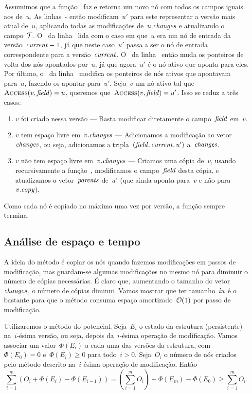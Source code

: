 \documentclass[../../main.tex]{subfiles}
\begin{document}
Assumimos que a função~ faz e retorna um novo nó com todos os campos iguais aos de~$u$. As linhas~- então modificam~$u'$ para este representar a versão mais atual de~$u$, aplicando todas as modificações de~$u.\mathit{changes}$ e atualizando o campo~$\mathcal{T}$. O~ da linha~ lida com o caso em que~$u$ era um nó de entrada da versão~$\mathit{current}-1$, já que neste caso~$u'$ passa a ser o nó de entrada correspondente para a versão~$\mathit{current}$. O~ da linha~ então muda os ponteiros de volta dos nós apontados por~$u$, já que agora~$u'$ é o nó ativo que aponta para eles. Por último, o~ da linha~ modifica os ponteiros de nós ativos que apontavam para~$u$, fazendo-os apontar para~$u'$. Seja~$v$ um nó ativo tal que~$\Call{Access}{v, \V{field}} = u$, queremos que~$\Call{Access}{v, \V{field}} = u'$. Isso se reduz a três casos:
\begin{enumerate}
\item $v$ foi criado nessa versão --- Basta modificar diretamente o campo~$\mathit{field}$ em~$v$.
\item $v$ tem espaço livre em~$v.\mathit{changes}$ --- Adicionamos a modificação ao vetor~$\mathit{changes}$, ou seja, adicionamos a tripla~$(\mathit{field}, \mathit{current}, u')$ a~$\mathit{changes}$.
\item $v$ não tem espaço livre em~$v.\mathit{changes}$ --- Criamos uma cópia de~$v$, usando recursivamente a função~\textsc{}, modificamos o campo~$\mathit{field}$ desta cópia, e atualizamos o vetor~$\mathit{parents}$ de~$u'$ (que ainda aponta para~$v$ e não para~$v.\mathit{copy}$).
\end{enumerate}

Como cada nó é copiado no máximo uma vez por versão, a função sempre termina.

\subsection{Análise de espaço e tempo}

A ideia do método é copiar os nós quando fazemos modificações em passos de modificação, mas guardam-se algumas modificações no mesmo nó para diminuir o número de cópias necessárias. É claro que, aumentando o tamanho do vetor~$\mathit{changes}$, o número de cópias diminui. Vamos mostrar que ter tamanho~$\mathit{in}$ é o bastante para que o método consuma espaço amortizado~$\mathcal{O}(1)$ por passo de modificação.

Utilizaremos o método do potencial. Seja~$E_i$ o estado da estrutura (persistente) na~$i$-ésima versão, ou seja, depois da~$i$-ésima operação de modificação. Vamos associar um valor~$\Phi(E_i)$ a cada uma das versões da estrutura, com~$\Phi(E_0) = 0$ e~$\Phi(E_i) \geq 0$ para todo~$i > 0$. Seja~$O_i$ o número de nós criados pelo método descrito na~$i$-ésima operação de modificação. Então
$$ \sum\limits_{i=1}^{m}{\left(O_i + \Phi(E_i) - \Phi(E_{i-1})\right)} = \left(\sum\limits_{i=1}^m{O_i}\right) + \Phi(E_m) - \Phi(E_0) \geq \sum\limits_{i=1}^m{O_i}. $$
\end{document}

